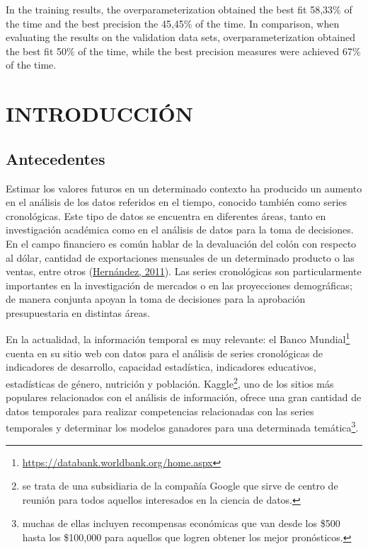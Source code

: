 \documentclass[
]{article}
\begin{document}
In the training results, the overparameterization obtained the best fit
58,33\% of the time and the best precision the 45,45\% of the time. In
comparison, when evaluating the results on the validation data sets,
overparameterization obtained the best fit 50\% of the time, while the
best precision measures were achieved 67\% of the time.

\cleardoublepage

\listoftables

\listoffigures

\cleardoublepage
{}



\newpage

\section{INTRODUCCIÓN}  
\setcounter{page}{1}

\label{chap:introduccion}

\subsection{Antecedentes}

Estimar los valores futuros en un determinado contexto ha producido un
aumento en el análisis de los datos referidos en el tiempo, conocido
también como series cronológicas. Este tipo de datos se encuentra en
diferentes áreas, tanto en investigación académica como en el análisis
de datos para la toma de decisiones. En el campo financiero es común
hablar de la devaluación del colón con respecto al dólar, cantidad de
exportaciones mensuales de un determinado producto o las ventas, entre
otros (\protect\hyperlink{ref-oscarh-1}{Hernández, 2011}). Las series
cronológicas son particularmente importantes en la investigación de
mercados o en las proyecciones demográficas; de manera conjunta apoyan
la toma de decisiones para la aprobación presupuestaria en distintas
áreas.

En la actualidad, la información temporal es muy relevante: el Banco
Mundial\footnote{\url{https://databank.worldbank.org/home.aspx}} cuenta
en su sitio web con datos para el análisis de series cronológicas de
indicadores de desarrollo, capacidad estadística, indicadores
educativos, estadísticas de género, nutrición y población.
Kaggle\footnote{se trata de una subsidiaria de la compañía Google que
  sirve de centro de reunión para todos aquellos interesados en la
  ciencia de datos.}, uno de los sitios más populares relacionados con
el análisis de información, ofrece una gran cantidad de datos temporales
para realizar competencias relacionadas con las series temporales y
determinar los modelos ganadores para una determinada
temática\footnote{muchas de ellas incluyen recompensas económicas que
  van desde los \$500 hasta los \$100,000 para aquellos que logren
  obtener los mejor pronósticos.}.
\end{document}
